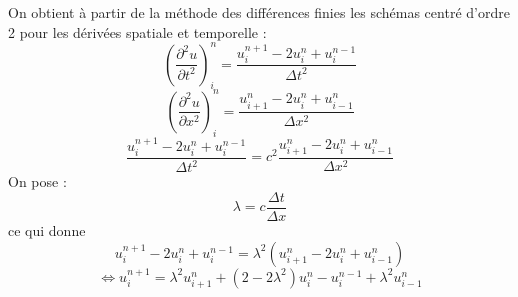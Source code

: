 On obtient à partir de la méthode des différences finies les schémas centré d'ordre 2 pour les dérivées spatiale et temporelle : 
\begin{equation*}
(\frac{\partial^2u}{\partial t^2})^{n}_{i} = \frac{u^{n+1}_{i} - 2u^{n}_{i} + u^{n-1}_{i}}{\Delta t^2}
\end{equation*}
\vspace*{3 mm}
\begin{equation*}
(\frac{\partial^2u}{\partial x^2})^{n}_{i} = \frac{u^{n}_{i+1} - 2u^{n}_{i} + u^{n}_{i-1}}{\Delta x^2}
\end{equation*}
\vspace*{3 mm}
\begin{equation*}
\frac{u^{n+1}_{i} - 2u^{n}_{i} + u^{n-1}_{i}}{\Delta t^2} = c^2 \frac{u^{n}_{i+1} - 2u^{n}_{i} + u^{n}_{i-1}}{\Delta x^2}
\end{equation*}
\hspace*{0.6cm} On pose :
\begin{equation*}
\lambda = c \frac{\Delta t}{\Delta x}
\end{equation*}
\hspace*{0.6cm} ce qui donne
\begin{equation*}
u^{n+1}_{i} - 2u^{n}_{i} + u^{n-1}_{i} = \lambda ^2 (u^{n}_{i+1} - 2u^{n}_{i} + u^{n}_{i-1})
\end{equation*}
\vspace*{3 mm}
\begin{equation*}
\Leftrightarrow
\boxed{
u^{n+1}_{i} = \lambda ^2 u^{n}_{i+1} + (2 - 2\lambda ^2)u^{n}_{i} - u^{n-1}_{i} + \lambda ^2 u^{n}_{i-1}}
\end{equation*}

\vspace*{7 mm}

